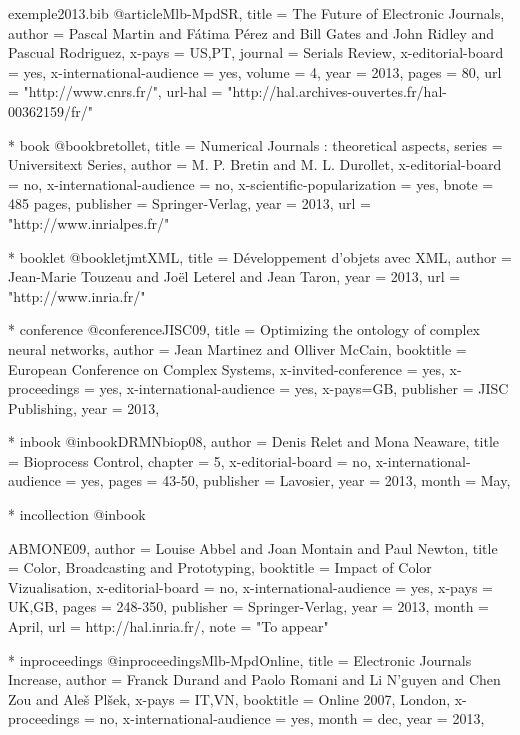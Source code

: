 \documentclass{ra2013}
\begin{document}
\begin{filecontents+}{exemple2013.bib}
@article{Mlb-MpdSR,
title = {The Future of Electronic Journals},
author = {Pascal Martin and Fátima Pérez and Bill Gates and John Ridley and Pascual Rodriguez},
x-pays = {US,PT},
journal = {Serials Review}, 
x-editorial-board = {yes}, 
x-international-audience = {yes}, 
volume = 4, 
year = 2013, 
pages = 80, 
url =  "http://www.cnrs.fr/",
url-hal = "http://hal.archives-ouvertes.fr/hal-00362159/fr/"
} 


    * book
@book{bretollet,
title = {Numerical Journals : theoretical aspects}, 
series = {Universitext Series}, 
author = {M. P. Bretin and M. L. Durollet}, 
x-editorial-board = {no}, 
x-international-audience = {no}, 
x-scientific-popularization = {yes}, 
bnote = {485 pages}, 
publisher = {Springer-Verlag}, 
year = 2013, 
url = "http://www.inrialpes.fr/"
}


    * booklet
@booklet{jmtXML,
title = {Développement d'objets avec XML}, 
author = {Jean-Marie Touzeau and Joël Leterel and Jean Taron}, 
year = 2013, 
url =  "http://www.inria.fr/"
}
	
	
    * conference
@conference{JISC09,
title = {Optimizing the ontology of complex neural networks}, 
author = {Jean Martinez and Olliver McCain}, 
booktitle = {European Conference on Complex Systems}, 
x-invited-conference = {yes}, 
x-proceedings = {yes}, 
x-international-audience = {yes}, 
x-pays={GB},
publisher = {JISC Publishing}, 
year = 2013, 
}


    * inbook
@inbook{DRMNbiop08,
author = {Denis Relet and Mona Neaware}, 
title = {Bioprocess Control}, 
chapter = {5}, 
x-editorial-board = {no}, 
x-international-audience = {yes}, 
pages = {43-50}, 
publisher = {Lavosier}, 
year = 2013, 
month = {May}, 
}


	* incollection
@inbook{ABMONE09,
author = {Louise Abbel and Joan Montain and Paul Newton}, 
title = {Color, Broadcasting and Prototyping}, 
booktitle = {Impact of Color Vizualisation}, 
x-editorial-board = {no}, 
x-international-audience = {yes}, 
x-pays = {UK,GB},
pages = {248-350}, 
publisher = {Springer-Verlag}, 
year = 2013, 
month = {April},
url = {http://hal.inria.fr/}, 
note = "To appear"

}

 
	* inproceedings
@inproceedings{Mlb-MpdOnline,
title = {Electronic Journals Increase},
author = {Franck Durand and Paolo Romani and Li N'guyen and Chen Zou and Aleš Plšek},
x-pays = {IT,VN}, 
booktitle = {Online 2007, London}, 
x-proceedings = {no}, 
x-international-audience = {yes},
month = dec,
year = 2013,
}



\end{filecontents+}
\end{document}
